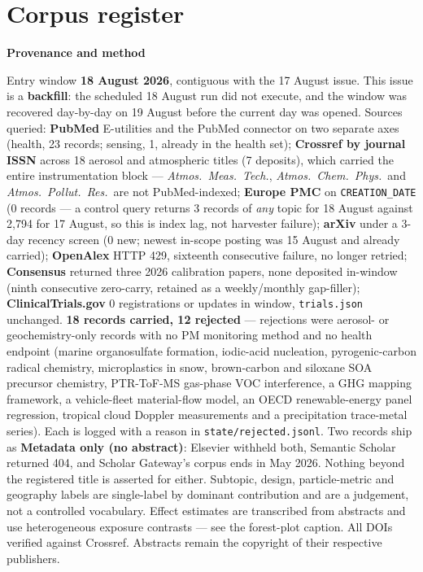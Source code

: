 \documentclass[10pt]{article}
\begin{document}
\section*{\sffamily\bfseries\color{Deep}Corpus register}
\vspace{-1.5mm}{\color{Amber}\rule{\linewidth}{1.1pt}}\vspace{2.5mm}



\vspace{4mm}
\begin{keybox}
{\sffamily\bfseries\footnotesize\color{Deep}Provenance and method}\\[1.2mm]
{\fontsize{7.2}{8.8}\selectfont
Entry window \textbf{18 August 2026}, contiguous with the 17 August issue. This issue is a
\textbf{backfill}: the scheduled 18 August run did not execute, and the window was
recovered day-by-day on 19 August before the current day was opened.
Sources queried: \textbf{PubMed} E-utilities and the PubMed connector on two separate axes
(health, 23 records; sensing, 1, already in the health set);
\textbf{Crossref by journal ISSN} across 18 aerosol and atmospheric titles (7 deposits),
which carried the entire instrumentation block --- \textit{Atmos.\ Meas.\ Tech.},
\textit{Atmos.\ Chem.\ Phys.}\ and \textit{Atmos.\ Pollut.\ Res.}\ are not PubMed-indexed;
\textbf{Europe PMC} on \texttt{CREATION\_DATE} (0 records --- a control query returns
3 records of \emph{any} topic for 18 August against 2{,}794 for 17 August, so this is
index lag, not harvester failure); \textbf{arXiv} under a 3-day recency screen
(0 new; newest in-scope posting was 15 August and already carried);
\textbf{OpenAlex} HTTP 429, sixteenth consecutive failure, no longer retried;
\textbf{Consensus} returned three 2026 calibration papers, none deposited in-window
(ninth consecutive zero-carry, retained as a weekly/monthly gap-filler);
\textbf{ClinicalTrials.gov} 0 registrations or updates in window, \texttt{trials.json}
unchanged.
\textbf{18 records carried, 12 rejected} --- rejections were aerosol- or
geochemistry-only records with no PM monitoring method and no health endpoint (marine
organosulfate formation, iodic-acid nucleation, pyrogenic-carbon radical chemistry,
microplastics in snow, brown-carbon and siloxane SOA precursor chemistry, PTR-ToF-MS
gas-phase VOC interference, a GHG mapping framework, a vehicle-fleet material-flow model,
an OECD renewable-energy panel regression, tropical cloud Doppler measurements and a
precipitation trace-metal series). Each is logged with a reason in
\texttt{state/rejected.jsonl}.
Two records ship as \textbf{Metadata only (no abstract)}: Elsevier withheld both, Semantic
Scholar returned 404, and Scholar Gateway's corpus ends in May 2026. Nothing beyond the
registered title is asserted for either.
Subtopic, design, particle-metric and geography labels are single-label by dominant
contribution and are a judgement, not a controlled vocabulary. Effect estimates are
transcribed from abstracts and use heterogeneous exposure contrasts --- see the forest-plot
caption. All DOIs verified against Crossref. Abstracts remain the copyright of their
respective publishers.\par}
\end{keybox}
\end{document}
